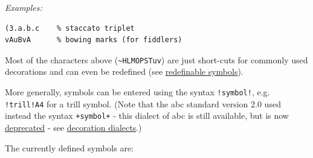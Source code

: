 \documentclass[oneside]{book}
\begin{document}
\emph{Examples:}

\begin{verbatim}
(3.a.b.c    % staccato triplet
vAuBvA      % bowing marks (for fiddlers)
\end{verbatim}

Most of the characters above (\texttt{\textasciitilde{}HLMOPSTuv}) are
just short-cuts for commonly used decorations and can even be redefined
(see \protect\hyperlink{redefinable_symbols}{redefinable symbols}).

More generally, symbols can be entered using the syntax
\texttt{!symbol!}, e.g. \texttt{!trill!A4} for a trill symbol. (Note
that the abc standard version 2.0 used instead the syntax
\texttt{+symbol+} - this dialect of abc is still available, but is now
\protect\hyperlink{outdated_syntax}{deprecated} - see
\protect\hyperlink{decoration_dialects}{decoration dialects}.)

The currently defined symbols are:
\end{document}
